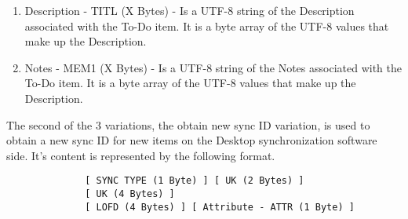 \begin{enumerate}
              \item Description - TITL (X Bytes) - Is a UTF-8 string of the
              Description associated with the To-Do item. It is a byte array of
              the UTF-8 values that make up the Description.

              \item Notes - MEM1 (X Bytes) - Is a UTF-8 string of the Notes
              associated with the To-Do item. It is a byte array of the UTF-8
              values that make up the Description.
            \end{enumerate}

            The second of the 3 variations, the obtain new sync ID variation,
            is used to obtain a new sync ID for new items on the Desktop
            synchronization software side. It's content is represented by the
            following format.

            \begin{verbatim}
              [ SYNC TYPE (1 Byte) ] [ UK (2 Bytes) ]
              [ UK (4 Bytes) ]
              [ LOFD (4 Bytes) ] [ Attribute - ATTR (1 Byte) ]
            \end{verbatim}

